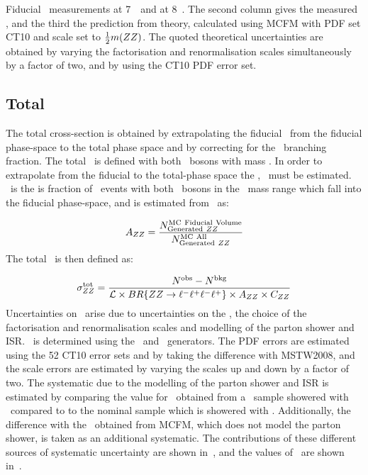 \begin{table}
      \caption[Fiducial \CX\ measurements at 7~\tev\ and at 8~\tev.]
      { Fiducial \CX\ measurements at 7~\tev\ and at 8~\tev. The second column
      gives the measured \cx, and the third the prediction from theory,
      calculated using MCFM with PDF set CT10 and scale set to
      $\frac{1}{2}m(ZZ)$. The quoted theoretical uncertainties are obtained by
      varying the factorisation and renormalisation scales simultaneously by a
      factor of two, and by using the CT10 PDF error set.} 
    \label{table:meas-fid-cx}
\renewcommand\arraystretch{1}
\end{table}


\subsection{Total \CX}

The total cross-section is obtained by extrapolating the fiducial \cx\ from the
fiducial phase-space to the total phase space and by correcting for the \ZZllll\
branching fraction. The total \cx\ is defined with both \Z\ bosons with mass
\sstooosZ. In order to extrapolate from the fiducial to the total-phase
space the \intro{fiducial acceptance factor}, \AZZ\ must be estimated. \AZZ\ is
the is fraction of \ZZ\ events with both \Z\ bosons in the \sstooosZ\ mass range which fall into the fiducial phase-space, and is
estimated from \mcsim\ as:

\begin{equation}
\AZZ = \frac{ N^{\rm MC\ Fiducial\ Volume}_{{\rm Generated}\ ZZ} }{ N^{{\rm MC\
All}}_{{\rm Generated}\ ZZ} }
\end{equation}
The total \cx\ is then defined as:

\begin{equation}\label{eq:xsectot_fourl}
\sigma_{ZZ}^{\rm tot} = \frac{ N^{\rm obs} - N^{\rm bkg}}{\mathcal{L} \times
BR\{{ZZ\rightarrow\ell^{-}\ell^{+}\ell^{-}\ell^{+}}\} \times A_{ZZ} \times C_{ZZ}}
\end{equation}
Uncertainties on \AZZ\ arise due to uncertainties on the \partDF, the choice of
the factorisation and renormalisation scales and modelling of the parton shower
and ISR. \AZZ\ is determined using the \powhegbox\ and \ggtwoZZ\ generators. The
PDF errors are estimated using the 52 CT10 error sets and by taking the
difference with MSTW2008, and the scale errors are estimated by varying the scales
up and down by a factor of two. The systematic due to the modelling of the parton shower
and ISR is estimated by comparing the value for \AZZ\ obtained from a
\powhegbox\ sample showered with \herwig\ compared to to the nominal sample
which is showered with \pythia. Additionally, the difference with the \AZZ\
obtained from MCFM, which does not model the parton shower, is taken as an
additional systematic. The contributions of these different sources of
systematic uncertainty are shown in~\tab{azz-syst}, and the values of \AZZ\ are
shown in~\tab{azz}.

